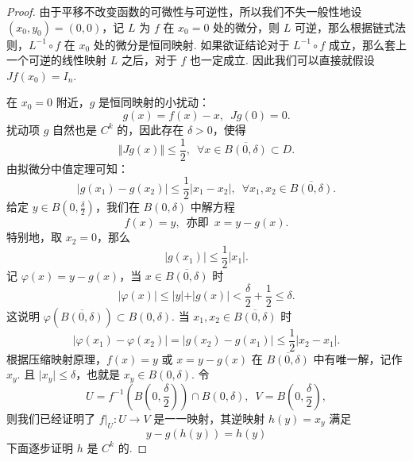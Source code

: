 \begin{proof}

    由于平移不改变函数的可微性与可逆性，所以我们不失一般性地设 $(x_0, y_0) = (0, 0)$，记 $L$ 为 $f$ 在 $x_0 = 0$ 处的微分，则 $L$ 可逆，那么根据链式法则，$L^{-1}\circ f$ 在 $x_0$ 处的微分是恒同映射. 如果欲证结论对于 $L^{-1}\circ f$ 成立，那么套上一个可逆的线性映射 $L$ 之后，对于 $f$ 也一定成立. 因此我们可以直接就假设 $Jf(x_0) = I_n$.

    在 $x_0 = 0$ 附近，$g$ 是恒同映射的小扰动：\[g(x) = f(x) - x,\enspace Jg(0) = 0.\]
    扰动项 $g$ 自然也是 $C^k$ 的，因此存在 $\delta > 0$，使得\[\Vert Jg(x)\Vert \leqslant \frac{1}{2},\enspace \forall x\in \overline{B(0, \delta)}\subset D.\]
    由拟微分中值定理可知：\[\vert g(x_1) - g(x_2)\vert \leqslant \frac{1}{2}\vert x_1 - x_2\vert,\enspace \forall x_1, x_2\in \overline{B(0, \delta)}.\]
    给定 $y\in B(0, \frac{\delta}{2})$，我们在 $B(0, \delta)$ 中解方程 \[f(x) = y,\enspace\text{亦即}\enspace x = y - g(x).\]
    特别地，取 $x_2 = 0$，那么 \[\vert g(x_1) \vert \leqslant \frac{1}{2}\vert x_1\vert.\]
    记 $\varphi(x) = y - g(x)$，当 $x\in \overline{B(0, \delta)}$ 时\[\vert \varphi(x)\vert \leqslant \vert y\vert +\vert g(x)\vert < \frac{\delta}{2} + \frac{1}{2} \leqslant \delta.\]
    这说明 $\varphi(\overline{B(0, \delta)})\subset B(0, \delta)$. 当 $x_1, x_2\in \overline{B(0, \delta)}$ 时\[\vert \varphi(x_1) - \varphi(x_2) \vert = \vert g(x_2) - g(x_1)\vert \leqslant \frac{1}{2}\vert x_2 - x_1\vert.\]
    根据压缩映射原理，$f(x) = y$ 或 $x = y - g(x)$ 在 $\overline{B(0, \delta)}$ 中有唯一解，记作 $x_y$. 且 $\vert x_y\vert \leqslant \delta$，也就是 $x_y\in B(0, \delta)$. 令\[U = f^{-1}(B(0, \frac{\delta}{2}))\cap B(0, \delta),\enspace V = B(0, \frac{\delta}{2}),\]
    则我们已经证明了 $\left.f\right|_U: U\to V$ 是一一映射，其逆映射 $h(y) = x_y$ 满足 \[y - g(h(y)) = h(y)\]
    下面逐步证明 $h$ 是 $C^k$ 的.


\end{proof}
